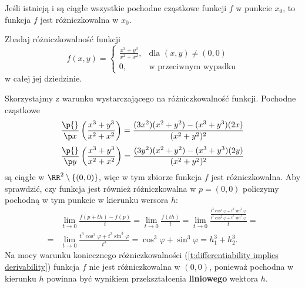 \begin{theorem}
    \label{t:differentiability of multivar functions}
    Jeśli istnieją i są ciągłe wszystkie pochodne cząstkowe funkcji $f$ w punkcie $x_0$, to funkcja $f$ jest różniczkowalna w $x_0$.
\end{theorem}

\begin{example}
    Zbadaj różniczkowalność funkcji
    \[ f(x, y) = \begin{cases}\frac{x^3 + y^3}{x^2 + x^2}, & \text{dla } (x, y) \neq (0, 0) \\ 0, & \text{w przeciwnym wypadku}\end{cases} \]
    w całej jej dziedzinie.
\end{example}
\begin{solution}
    Skorzystajmy z warunku wystarczającego na różniczkowalność funkcji. Pochodne cząstkowe
    \[ \frac{\p{}}{\p x}\left(\frac{x^3 + y^3}{x^2 + x^2}\right) = \frac{(3x^2)(x^2 + y^2) - (x^3 + y^3)(2x)}{(x^2 + y^2)^2} \]
    \[ \frac{\p{}}{\p y}\left(\frac{x^3 + y^3}{x^2 + x^2}\right) = \frac{(3y^2)(x^2 + y^2) - (x^3 + y^3)(2y)}{(x^2 + y^2)^2} \]
    są ciągłe w $\RR^2 \setminus \{(0, 0)\}$, więc w tym zbiorze funkcja $f$ jest różniczkowalna. Aby sprawdzić, czy funkcja jest również różniczkowalna w $p = (0, 0)$ policzymy pochodną w tym punkcie w kierunku wersora $h$:
    \begin{align*}
        &\lim_{t\to 0}\frac{f(p+th) - f(p)}{t} = \lim_{t\to 0}\frac{f(th)}{t} = \lim_{t\to 0}\frac{\frac{t^3\cos^3\varphi + t^3\sin^3\varphi}{t^2\cos^2\varphi + t^2\sin^2\varphi}}{t} = \\
        =& \lim_{t\to 0}\frac{t^3\cos^3\varphi + t^3\sin^3\varphi}{t^3} = \cos^3\varphi + \sin^3\varphi = h_1^3 + h_2^3.
    \end{align*}
    Na mocy warunku koniecznego różniczkowalności (\ref{t:differentiability implies derivability}) funkcja $f$ nie jest różniczkowalna w $(0, 0)$, ponieważ pochodna w kierunku $h$ powinna być wynikiem przekształcenia \textbf{liniowego} wektora $h$.
\end{solution}
